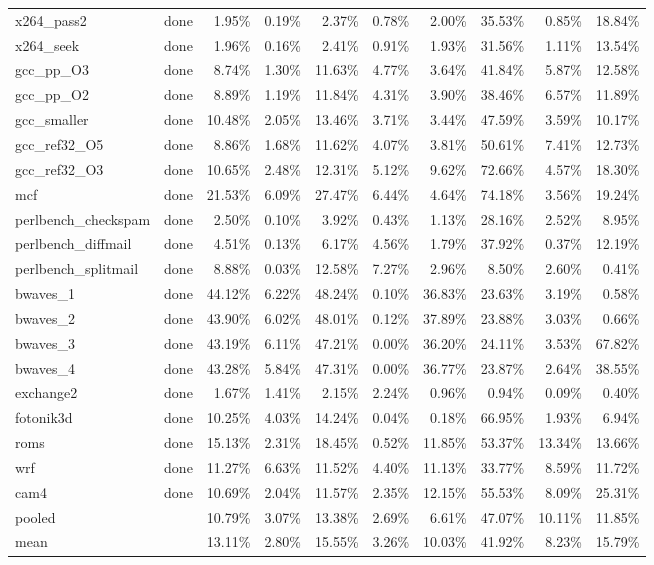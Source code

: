 \documentclass[10pt,a4paper,landscape]{article}
\begin{document}
{\begin{longtable}{llrrrrrrrr}
x264\_pass2 & done & 1.95\% & 0.19\% & 2.37\% & 0.78\% & 2.00\% & 35.53\% & 0.85\% & 18.84\% \\
x264\_seek & done & 1.96\% & 0.16\% & 2.41\% & 0.91\% & 1.93\% & 31.56\% & 1.11\% & 13.54\% \\
gcc\_pp\_O3 & done & 8.74\% & 1.30\% & 11.63\% & 4.77\% & 3.64\% & 41.84\% & 5.87\% & 12.58\% \\
gcc\_pp\_O2 & done & 8.89\% & 1.19\% & 11.84\% & 4.31\% & 3.90\% & 38.46\% & 6.57\% & 11.89\% \\
gcc\_smaller & done & 10.48\% & 2.05\% & 13.46\% & 3.71\% & 3.44\% & 47.59\% & 3.59\% & 10.17\% \\
gcc\_ref32\_O5 & done & 8.86\% & 1.68\% & 11.62\% & 4.07\% & 3.81\% & 50.61\% & 7.41\% & 12.73\% \\
gcc\_ref32\_O3 & done & 10.65\% & 2.48\% & 12.31\% & 5.12\% & 9.62\% & 72.66\% & 4.57\% & 18.30\% \\
mcf & done & 21.53\% & 6.09\% & 27.47\% & 6.44\% & 4.64\% & 74.18\% & 3.56\% & 19.24\% \\
perlbench\_checkspam & done & 2.50\% & 0.10\% & 3.92\% & 0.43\% & 1.13\% & 28.16\% & 2.52\% & 8.95\% \\
perlbench\_diffmail & done & 4.51\% & 0.13\% & 6.17\% & 4.56\% & 1.79\% & 37.92\% & 0.37\% & 12.19\% \\
perlbench\_splitmail & done & 8.88\% & 0.03\% & 12.58\% & 7.27\% & 2.96\% & 8.50\% & 2.60\% & 0.41\% \\
bwaves\_1 & done & 44.12\% & 6.22\% & 48.24\% & 0.10\% & 36.83\% & 23.63\% & 3.19\% & 0.58\% \\
bwaves\_2 & done & 43.90\% & 6.02\% & 48.01\% & 0.12\% & 37.89\% & 23.88\% & 3.03\% & 0.66\% \\
bwaves\_3 & done & 43.19\% & 6.11\% & 47.21\% & 0.00\% & 36.20\% & 24.11\% & 3.53\% & 67.82\% \\
bwaves\_4 & done & 43.28\% & 5.84\% & 47.31\% & 0.00\% & 36.77\% & 23.87\% & 2.64\% & 38.55\% \\
exchange2 & done & 1.67\% & 1.41\% & 2.15\% & 2.24\% & 0.96\% & 0.94\% & 0.09\% & 0.40\% \\
fotonik3d & done & 10.25\% & 4.03\% & 14.24\% & 0.04\% & 0.18\% & 66.95\% & 1.93\% & 6.94\% \\
roms & done & 15.13\% & 2.31\% & 18.45\% & 0.52\% & 11.85\% & 53.37\% & 13.34\% & 13.66\% \\
wrf & done & 11.27\% & 6.63\% & 11.52\% & 4.40\% & 11.13\% & 33.77\% & 8.59\% & 11.72\% \\
cam4 & done & 10.69\% & 2.04\% & 11.57\% & 2.35\% & 12.15\% & 55.53\% & 8.09\% & 25.31\% \\
\midrule
pooled &  & 10.79\% & 3.07\% & 13.38\% & 2.69\% & 6.61\% & 47.07\% & 10.11\% & 11.85\% \\
mean &  & 13.11\% & 2.80\% & 15.55\% & 3.26\% & 10.03\% & 41.92\% & 8.23\% & 15.79\% \\
\end{longtable}
}
\end{document}

